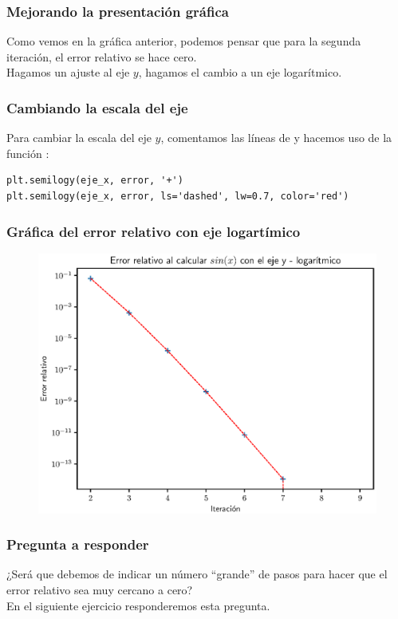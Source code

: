 \documentclass[12pt]{beamer}
\begin{document}
\begin{frame}
\frametitle{Mejorando la presentación gráfica}
Como vemos en la gráfica anterior, podemos pensar que para la segunda iteración, el error relativo se hace cero.
\\
\bigskip
\pause
Hagamos un ajuste al eje $y$, \pause hagamos el cambio a un eje logarítmico.
\end{frame}
\begin{frame}[fragile]
\frametitle{Cambiando la escala del eje}
Para cambiar la escala del eje $y$, comentamos las líneas de  y hacemos uso de la función :
\begin{lstlisting}
plt.semilogy(eje_x, error, '+')
plt.semilogy(eje_x, error, ls='dashed', lw=0.7, color='red')
\end{lstlisting}
\end{frame}
\begin{frame}
\frametitle{Gráfica del error relativo con eje logartímico}
\begin{figure}
    \centering
    \includegraphics[scale=0.6]{Imagenes/Plot_Serie_Seno_02.eps}
\end{figure}
\end{frame}
\begin{frame}
\frametitle{Pregunta a responder}
¿Será que debemos de indicar un número \enquote{grande} de pasos para hacer que el error relativo sea muy cercano a cero?
\\
\bigskip
\pause
En el siguiente ejercicio responderemos esta pregunta.
\end{frame}
\end{document}
